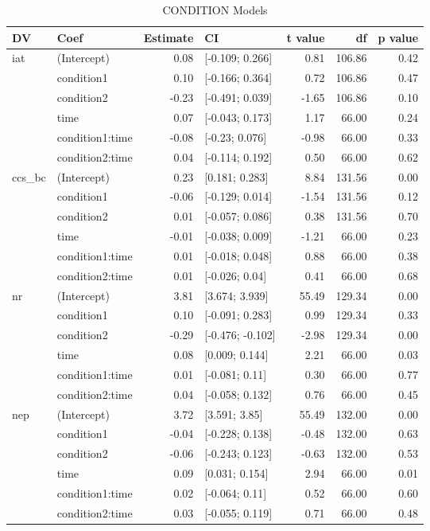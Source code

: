 \begin{table}[ht]
\centering
\begin{tabular}{llrlrrr}
  \hline
DV & Coef & Estimate & CI & t value & df & p value \\ 
  \hline
iat & (Intercept) & 0.08 & [-0.109; 0.266] & 0.81 & 106.86 & 0.42 \\ 
   & condition1 & 0.10 & [-0.166; 0.364] & 0.72 & 106.86 & 0.47 \\ 
   & condition2 & -0.23 & [-0.491; 0.039] & -1.65 & 106.86 & 0.10 \\ 
   & time & 0.07 & [-0.043; 0.173] & 1.17 & 66.00 & 0.24 \\ 
   & condition1:time & -0.08 & [-0.23; 0.076] & -0.98 & 66.00 & 0.33 \\ 
   & condition2:time & 0.04 & [-0.114; 0.192] & 0.50 & 66.00 & 0.62 \\ 
   \hline
ccs\_bc & (Intercept) & 0.23 & [0.181; 0.283] & 8.84 & 131.56 & 0.00 \\ 
   & condition1 & -0.06 & [-0.129; 0.014] & -1.54 & 131.56 & 0.12 \\ 
   & condition2 & 0.01 & [-0.057; 0.086] & 0.38 & 131.56 & 0.70 \\ 
   & time & -0.01 & [-0.038; 0.009] & -1.21 & 66.00 & 0.23 \\ 
   & condition1:time & 0.01 & [-0.018; 0.048] & 0.88 & 66.00 & 0.38 \\ 
   & condition2:time & 0.01 & [-0.026; 0.04] & 0.41 & 66.00 & 0.68 \\ 
   \hline
nr & (Intercept) & 3.81 & [3.674; 3.939] & 55.49 & 129.34 & 0.00 \\ 
   & condition1 & 0.10 & [-0.091; 0.283] & 0.99 & 129.34 & 0.33 \\ 
   & condition2 & -0.29 & [-0.476; -0.102] & -2.98 & 129.34 & 0.00 \\ 
   & time & 0.08 & [0.009; 0.144] & 2.21 & 66.00 & 0.03 \\ 
   & condition1:time & 0.01 & [-0.081; 0.11] & 0.30 & 66.00 & 0.77 \\ 
   & condition2:time & 0.04 & [-0.058; 0.132] & 0.76 & 66.00 & 0.45 \\ 
   \hline
nep & (Intercept) & 3.72 & [3.591; 3.85] & 55.49 & 132.00 & 0.00 \\ 
   & condition1 & -0.04 & [-0.228; 0.138] & -0.48 & 132.00 & 0.63 \\ 
   & condition2 & -0.06 & [-0.243; 0.123] & -0.63 & 132.00 & 0.53 \\ 
   & time & 0.09 & [0.031; 0.154] & 2.94 & 66.00 & 0.01 \\ 
   & condition1:time & 0.02 & [-0.064; 0.11] & 0.52 & 66.00 & 0.60 \\ 
   & condition2:time & 0.03 & [-0.055; 0.119] & 0.71 & 66.00 & 0.48 \\ 
   \hline
\end{tabular}
\caption{CONDITION Models } 
\label{tab:condition-models}
\end{table}
